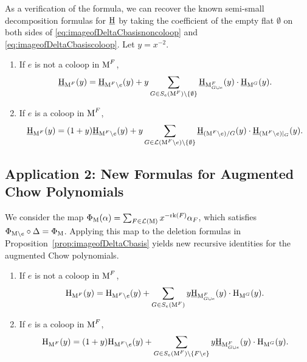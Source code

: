 \documentclass[11pt]{article}
\newcommand{\chow}{\normalfont\text{\underline{H}}}
\newcommand{\augchow}{\normalfont\text{H}}
\newcommand{\rank}{\normalfont\text{rk}}
\newcommand{\M}{\normalfont\text{M}}
\newcommand{\Ebasis}[1]{\mathrm{#1}}
\theoremstyle{remark}
\begin{document}
As a verification of the formula, we can recover the known semi-small decomposition formulas for \(\chow\) \cite{FMSV24} by taking the coefficient of the empty flat \(\Ebasis{\emptyset}\) on both sides of \eqref{eq:imageofDeltaCbasisnoncoloop} and \eqref{eq:imageofDeltaCbasiscoloop}. Let \(y=x^{-2}\).

\begin{tcolorbox}[colback=blue!5!white,colframe=blue!75!black,title=Decomposition Formulas for \(\chow\)]
    \begin{enumerate}
    \item If \(e\) is not a coloop in \(\M^F\),
    \[ \chow_{\M^F}(y) = \chow_{\M^F\setminus e}(y) + y\sum_{G \in S_e(\M^F)\setminus\{\emptyset\}} \chow_{\M^F_{G\cup e}}(y) \cdot \chow_{\M^G}(y). \]
    \item If \(e\) is a coloop in \(\M^F\),
    \[ \chow_{\M^F}(y) = (1+y)\chow_{\M^F\setminus e}(y) + y\sum_{G \in \mathcal{L}(\M^F\setminus e)\setminus\{\emptyset\}} \chow_{(\M^F\setminus e)/G}(y) \cdot \chow_{(\M^F\setminus e)|_G}(y). \]
    \end{enumerate}
\end{tcolorbox}

\subsection{Application 2: New Formulas for Augmented Chow Polynomials}
We consider the map \(\Phi_{\M}(\alpha) = \sum_{F \in \mathcal{L}(\M)} x^{-\rank(F)} \alpha_F\), which satisfies \(\Phi_{\M\setminus e}\circ \Delta = \Phi_{\M}\). Applying this map to the deletion formulas in Proposition~\ref{prop:imageofDeltaCbasis} yields new recursive identities for the augmented Chow polynomials.

\begin{tcolorbox}[colback=red!5!white,colframe=red!75!black,title=Decomposition Formulas for \(\augchow\)]
    \begin{enumerate}
    \item If \(e\) is not a coloop in \(\M^F\),
    \[ \augchow_{\M^F}(y) = \augchow_{\M^F\setminus e}(y) + \sum_{G \in S_e(\M^F)} y \chow_{\M^F_{G\cup e}}(y) \cdot \augchow_{\M^G}(y). \]
    \item If \(e\) is a coloop in \(\M^F\),
    \[ \augchow_{\M^F}(y) = (1+y)\augchow_{\M^F\setminus e}(y) + \sum_{G \in S_e(\M^F)\setminus\{F\setminus e\}} y \chow_{\M^F_{G\cup e}}(y) \cdot \augchow_{\M^G}(y). \]
    \end{enumerate}
\end{tcolorbox}
\end{document}
